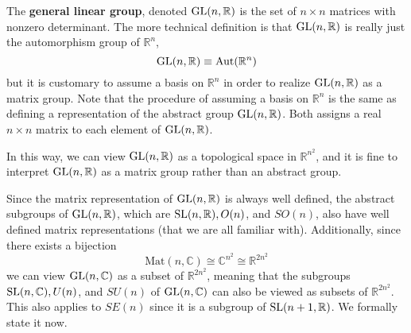   \begin{definition}
    The \textbf{general linear group}, denoted $\GL(n, \mathbb{R})$ is the set of $n \times n$ matrices with nonzero determinant. The more technical definition is that $\GL(n, \mathbb{R})$ is really just the automorphism group of $\mathbb{R}^n$, 
    \begin{equation}
      \GL(n, \mathbb{R}) \equiv \text{Aut}(\mathbb{R}^n)
    \end{equation}
    but it is customary to assume a basis on $\mathbb{R}^n$ in order to realize $\GL(n, \mathbb{R})$ as a matrix group. Note that the procedure of assuming a basis on $\mathbb{R}^n$ is the same as defining a representation of the abstract group $\GL(n, \mathbb{R})$. Both assigns a real $n \times n$ matrix to each element of $\GL(n, \mathbb{R})$. 
  \end{definition}

  In this way, we can view $\GL(n, \mathbb{R})$ as a topological space in $\mathbb{R}^{n^2}$, and it is fine to interpret $\GL(n, \mathbb{R})$ as a matrix group rather than an abstract group. 

  Since the matrix representation of $\GL(n, \mathbb{R})$ is always well defined, the abstract subgroups of $\GL(n, \mathbb{R})$, which are $\SL(n, \mathbb{R}), O(n)$, and $SO(n)$, also have well defined matrix representations (that we are all familiar with). Additionally, since there exists a bijection
  \begin{equation}
    \text{Mat}(n, \mathbb{C}) \cong \mathbb{C}^{n^2} \cong \mathbb{R}^{2 n^2}
  \end{equation}
  we can view $\GL(n, \mathbb{C})$ as a subset of $\mathbb{R}^{2n^2}$, meaning that the subgroups $\SL(n, \mathbb{C}), U(n)$, and $SU(n)$ of $\GL(n, \mathbb{C})$ can also be viewed as subsets of $\mathbb{R}^{2n^2}$. This also applies to $SE(n)$ since it is a subgroup of $\SL(n+1, \mathbb{R})$. We formally state it now. 

